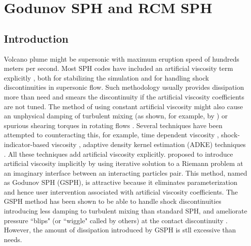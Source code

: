 \chapter{Godunov SPH and RCM SPH} \label{chapter:GSPH-RSPH}

\section{Introduction}
Volcano plume might be supersonic with maximum eruption speed of hundreds meters per second.
Most SPH codes have included an artificial viscosity term explicitly \citep{monaghan1983shock, monaghan1997sph, klapp2012strong}, both for stabilizing the simulation and for handling shock discontinuities in supersonic flow. Such methodology usually provides dissipation more than need and smears the discontinuity if the artificial viscosity coefficients are not tuned. The method of using constant artificial viscosity might also cause an unphysical damping of turbulent mixing (as shown, for example, by \citet{borgani2012hydrodynamic}) or spurious shearing torques in rotating flows \citep{flebbe1994smoothed}. Several techniques have been attempted to counteracting this, for example, time dependent viscosity \citep{morris1997switch, dolag2005turbulent}, shock-indicator-based viscosity \citep{cullen2010inviscid}, adaptive density kernel estimation (ADKE) techniques \citep{sigalotti2008adaptive}. All these techniques add artificial viscosity explicitly.  \citet{inutsuka2002reformulation} proposed to introduce artificial viscosity implicitly by using iterative solution to a Riemann problem at an imaginary interface between an interacting particles pair. This method, named as Godunov SPH (GSPH), is attractive because it eliminates parameterization and hence user intervention associated with artificial viscosity coefficients. The GSPH method has been shown to be able to handle shock discontinuities \citep{inutsuka2002reformulation, cha2003implementations,iwasaki2011smoothed, puri2014approximate} introducing less damping to turbulent mixing \citep{cha2010kelvin, borgani2012hydrodynamic} than standard SPH, and ameliorate pressure ``blips" (or ``wiggle" called by others) at the contact discontinuity \citep{borgani2012hydrodynamic}. However, the amount of dissipation introduced by GSPH is stll excessive than needs.

